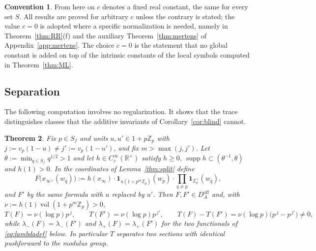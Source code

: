 \documentclass[11pt]{amsart}
\newtheorem{theorem}{Theorem}[section]
\theoremstyle{definition}
\newtheorem{convention}[theorem]{Convention}
\theoremstyle{remark}
\newcommand{\R}{\mathbb R}
\newcommand{\Z}{\mathbb Z}
\newcommand{\supp}{\operatorname{supp}}
\newcommand{\vol}{\operatorname{vol}}
\newcommand{\DA}{D_A}
\begin{document}
\begin{convention}\label{conv:c}
From here on $c$ denotes a fixed real constant, the same for every set $S$.
All results are proved for arbitrary $c$ unless the contrary is stated; the
value $c=0$ is adopted where a specific normalization is needed, namely in
Theorem~\ref{thm:RR}(f) and the auxiliary
Theorem~\ref{thm:mertens} of Appendix~\ref{app:mertens}.  The choice $c=0$ is the statement that no global
constant is added on top of the intrinsic constants of the local symbols
computed in Theorem~\ref{thm:ML}.
\end{convention}

\subsection{Separation}

The following computation involves no regularization.  It shows that the
trace distinguishes classes that the additive invariants of
Corollary~\ref{cor:blind} cannot.

\begin{theorem}\label{thm:separate}
Fix $p\in S_f$ and units $u,u'\in1+p\Z_p$ with
$j:=v_p(1-u)\ne j':=v_p(1-u')$, and fix $m>\max(j,j')$.  Let
$\theta:=\min_{q\in S_f}q^{1/2}>1$ and let $h\in C_c^{\infty}(\R^{\times})$
satisfy $h\ge0$, $\supp h\subset(\theta^{-1},\theta)$ and $h(1)>0$.  In the
coordinates of Lemma~\ref{thm:split} define
\begin{equation}\label{eq:sepsections}
F\bigl(x_{\infty},(w_q)\bigr):=h(x_{\infty})\cdot
\mathbf 1_{u(1+p^{m}\Z_p)}(w_p)\cdot\prod_{q\ne p}\mathbf 1_{\Z_q^{\times}}(w_q),
\end{equation}
and $F'$ by the same formula with $u$ replaced by $u'$.  Then $F,F'\in
\DA^{\mathrm{off}}$ and, with $\nu:=h(1)\vol(1+p^{m}\Z_p)>0$,
\begin{equation}\label{eq:sepvalues}
T(F)=\nu(\log p)p^{\,j},\qquad T(F')=\nu(\log p)p^{\,j'},\qquad
T(F)-T(F')=\nu(\log p)\bigl(p^{\,j}-p^{\,j'}\bigr)\neq0,
\end{equation}
while $\lambda_-(F)=\lambda_-(F')$ and $\lambda_+(F)=\lambda_+(F')$ for the two
functionals of \eqref{eq:lambdadef} below.  In particular $T$ separates two
sections with identical pushforward to the modulus group.
\end{theorem}
\end{document}
